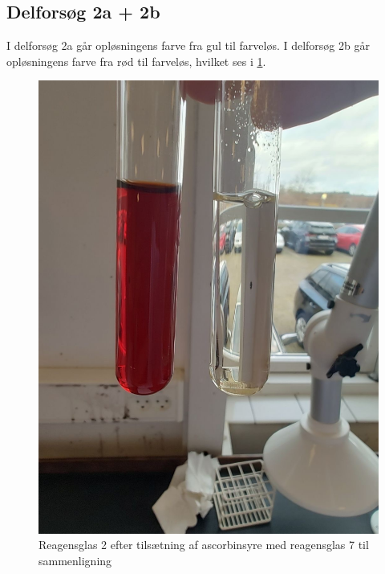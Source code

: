 \documentclass{report}
\begin{document}
\subsection*{Delforsøg 2a + 2b}
I delforsøg 2a går opløsningens farve fra gul til farveløs.
I delforsøg 2b går opløsningens farve fra rød til farveløs, hvilket ses i \cref{fig:for2}.
\begin{figure}[H]
\begin{center}
  \includegraphics[scale=0.23]{for2.jpeg}
\end{center}
\caption{Reagensglas 2 efter tilsætning af ascorbinsyre med reagensglas 7 til sammenligning}
\label{fig:for2}
\end{figure}
\end{document}
